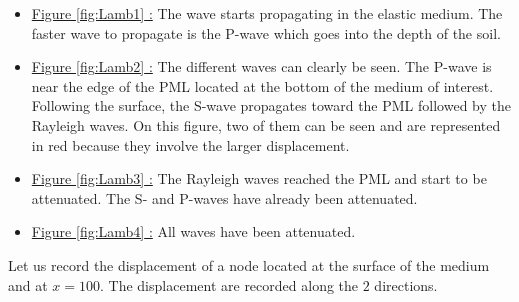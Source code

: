 \begin{itemize}
\item \underline{Figure \ref{fig:Lamb1} :} The wave starts propagating in the elastic medium. The faster wave to propagate is the P-wave which goes into the depth of the soil. 
\item \underline{Figure \ref{fig:Lamb2} :} The different waves can clearly be seen. The P-wave is near the edge of the PML located at the bottom of the medium of interest. Following the surface, the S-wave propagates toward the PML followed by the Rayleigh waves. On this figure, two of them can be seen and are represented in red because they involve the larger displacement.
\item \underline{Figure \ref{fig:Lamb3} :} The Rayleigh waves reached the PML and start to be attenuated. The S- and P-waves have already been attenuated.
\item \underline{Figure \ref{fig:Lamb4} :} All waves have been attenuated.
\end{itemize}
Let us record the displacement of a node located at the surface of the medium and at $x=100$. The displacement are recorded along the $2$ directions.
